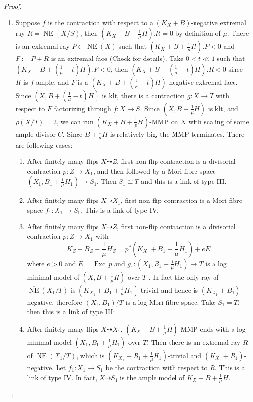 \documentclass{article}
\begin{document}
\begin{proof}
\begin{enumerate}
  \item\label{a}  Suppose $ f $ is the contraction with respect to a $ (K_X+B) $-negative extremal ray $ R= \overline{\operatorname{ NE }}(X/S) $, then $ (K_X+B+\frac{1}{\mu}H).R=0 $ by definition of $ \mu $. There is an extremal ray $ P \subset \overline{\operatorname{ NE }}(X) $ such that $ (K_X+B+\frac{1}{\mu}H).P<0 $ and $ F:=P+R $ is an extremal face  (Check \cite[5.4.2]{cortiFactoringBirationalMaps} for details). Take  $ 0<t\ll 1 $ such that $ (K_X+B+(\frac{1}{\mu}-t)H).P<0 $, then $  (K_X+B+(\frac{1}{\mu}-t)H).R<0 $ since $H$ is $f$-ample, and $ F $ is a $  (K_X+B+(\frac{1}{\mu}-t)H) $-negative extremal face. Since $ (X,B+(\frac{1}{\mu}-t)H) $ is klt, there is  a contraction $ g:X\to T $ with respect  to $ F $ factorizing through $ f:X\to S $. Since  $ (X,B+\frac{1}{\mu}H) $ is klt, and $ \rho(X/T)=2 $,  we can  run $ (K_X+B+\frac{1}{\mu}H) $-MMP on $ X  $ with scaling of some ample divisor $C$.  Since $ B+\frac{1}{\mu}H $ is relatively big,  the MMP terminates. There are following cases: 
  \begin{enumerate}
    \item\label{a1} 
After finitely many flips $ X\dashrightarrow Z $, first non-flip contraction is a divisorial contraction $ p:Z\to X_1 $, and then followed by a Mori fibre space $(X_{1},B_{1}+\frac{1}{\mu}H_{1} )\to S_{1}$. 
    Then  $S_{1} \cong T$ and this is a link of type III.     
   \item\label{a2}
      After finitely many flips $ X\dashrightarrow X_1 $, first non-flip contraction is a Mori fibre space $ f_1:X_1\to S_{1} $. This is a link of type IV.  
    \item \label{a3}
      After finitely many flips $ X\dashrightarrow Z $, first non-flip contraction is a divisorial contraction $ p:Z\to X_1$ with 
    \[ K_Z+B_Z+\frac{1}{\mu}H_Z=p^*(K_{X_1}+B_1+\frac{1}{\mu}H_1)+eE \]
    where $ e>0 $ and  $E=\operatorname{Exc}\,p$ and  $g_{1}: (X_1,B_1+\frac{1}{\mu}H_1) \to T$ is a log minimal model of $(X,B+\frac{1}{\mu}H)$ over $T$ . In fact the only ray of $ \overline{\operatorname{NE}}(X_1/T) $ is $ (K_{X_1}+B_1+\frac{1}{\mu}H_1) $-trivial and hence is $ (K_{X_1}+B_1) $-negative, therefore $ (X_1,B_1)/T $ is a log Mori fibre space. Take $ S_1=T $, then this is a link of type III:
  \item \label{a4}After finitely many flips $ X\dashrightarrow X_1 $, $(K_{X}+B+\frac{1}{\mu}H)$-MMP ends with a log minimal model $ (X_1,B_1+\frac{1}{\mu}H_1) $ over $T $. Then there is an extremal ray $R$ of $ \overline{\operatorname{NE}}(X_1/T) $, which is $ (K_{X_1}+B_1+\frac{1}{\mu}H_1) $-trivial and $ (K_{X_1}+B_1) $-negative. Let $ f_1:X_1\to S_1 $ be the contraction with respect to $R$. This is a link of type IV. In fact, $X \dashrightarrow  S_{1}$ is the ample model of $K_{X}+B+\frac{1}{\mu}H$.

\end{enumerate}
\end{enumerate}
\end{proof}
\end{document}
